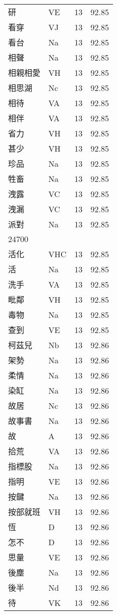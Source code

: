 \documentclass[twocolumn]{book}
\begin{document}
\begin{supertabular}{llrr}
研 & VE & 13 &  92.85\\
看穿 & VJ & 13 &  92.85\\
看台 & Na & 13 &  92.85\\
相聲 & Na & 13 &  92.85\\
相親相愛 & VH & 13 &  92.85\\
相思湖 & Nc & 13 &  92.85\\
相待 & VA & 13 &  92.85\\
相伴 & VA & 13 &  92.85\\
省力 & VH & 13 &  92.85\\
甚少 & VH & 13 &  92.85\\
珍品 & Na & 13 &  92.85\\
牲畜 & Na & 13 &  92.85\\
洩露 & VC & 13 &  92.85\\
洩漏 & VC & 13 &  92.85\\
派對 & Na & 13 &  92.85\\
24700\\
活化 & VHC & 13 &  92.85\\
活 & Na & 13 &  92.85\\
洗手 & VA & 13 &  92.85\\
毗鄰 & VH & 13 &  92.85\\
毒物 & Na & 13 &  92.85\\
查到 & VE & 13 &  92.85\\
柯茲兒 & Nb & 13 &  92.86\\
架勢 & Na & 13 &  92.86\\
柔情 & Na & 13 &  92.86\\
染缸 & Na & 13 &  92.86\\
故居 & Nc & 13 &  92.86\\
故事書 & Na & 13 &  92.86\\
故 & A & 13 &  92.86\\
拾荒 & VA & 13 &  92.86\\
指標股 & Na & 13 &  92.86\\
指明 & VE & 13 &  92.86\\
按鍵 & Na & 13 &  92.86\\
按部就班 & VH & 13 &  92.86\\
恆 & D & 13 &  92.86\\
怎不 & D & 13 &  92.86\\
思量 & VE & 13 &  92.86\\
後塵 & Na & 13 &  92.86\\
後半 & Nd & 13 &  92.86\\
待 & VK & 13 &  92.86\\

\end{supertabular}
\end{document}
